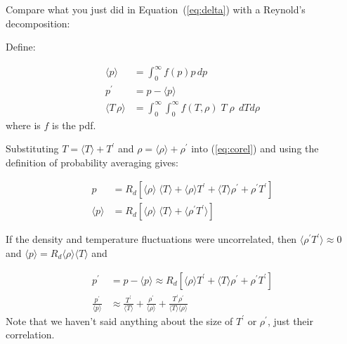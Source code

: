 \documentclass[12pt]{article}
\begin{document}
Compare what you just did in Equation~(\ref{eq:delta}) with a Reynold's decomposition:

Define:

\begin{subequations}
\begin{align}
  \label{eq:pbar}
  \langle p \rangle & = \int_{ 0}^{\infty} f(p) p \!\,d p\\
  p^\prime& = p - \langle p \rangle \\
  \langle {T \,\rho } \rangle & = \int_{ 0}^{\infty} \int_{ 0}^{\infty} f(T, \rho) \; T \; \rho \; \,dT d \rho \label{eq:corel}
\end{align}
\end{subequations}
where is $f$ is the pdf.

Substituting $T = \langle T \rangle + T^\prime$ and $\rho = \langle {\rho} \rangle + \rho^\prime$ into (\ref{eq:corel})
and using the definition of probability averaging gives:

\begin{subequations}
\begin{align}
  \label{eq:p}
  p &= R_d \left [ \langle {\rho} \rangle \; \langle {T} \rangle  + \langle {\rho} \rangle  T^\prime + \langle {T} \rangle  \rho^\prime + \rho^\prime T^\prime \right ] \\
\langle {p} \rangle  & = R_d \left [ \langle {\rho} \rangle  \; \langle {T} \rangle  + \langle {\rho^\prime T^\prime} \rangle  \right ] 
\end{align}
\end{subequations}

If the density and temperature fluctuations were uncorrelated, then $\langle {\rho^\prime T^\prime} \rangle \approx 0$ and
$\langle {p} \rangle  = R_d \langle {\rho} \rangle  \langle {T} \rangle $ and 


\begin{subequations}
\begin{align}
  \label{eq:pbar}
  p^\prime& = p - \langle {p} \rangle  \approx R_d \left [  \langle {\rho} \rangle  T^\prime + \langle {T} \rangle  \rho^\prime + \rho^\prime T^\prime \right ] \\
\frac{p^\prime}{\langle {p} \rangle } & \approx \frac{ T^\prime}{ \langle {T} \rangle } + \frac{\rho^\prime }{\langle {\rho} \rangle } 
+\frac{T^\prime \rho^\prime }{ \langle {T} \rangle  \langle {\rho} \rangle }
\end{align}
\end{subequations}
Note that we haven't said anything about the size of $T^\prime$ or $\rho^\prime$, just their correlation.
\end{document}
